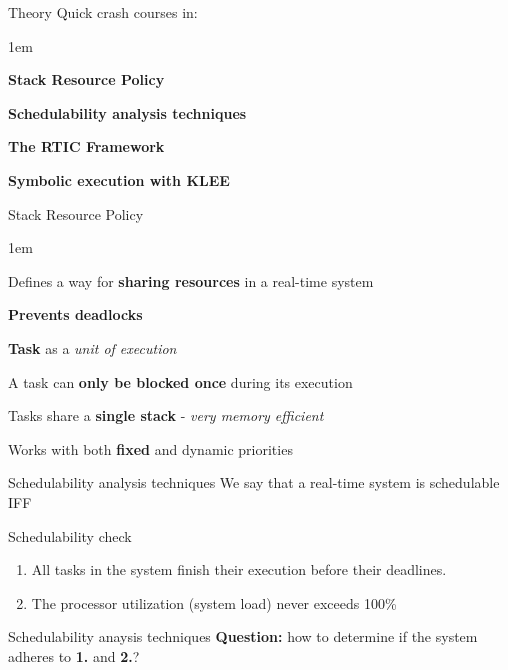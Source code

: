 \begin{frame}{Theory}
    Quick crash courses in:
    \vspace{1em}
    \begin{itemize-size}{1em}
        \item \textbf{Stack Resource Policy}
        \item \textbf{Schedulability analysis techniques}
        \item \textbf{The RTIC Framework}
        \item \textbf{Symbolic execution with KLEE}
    \end{itemize-size}
\end{frame}

\begin{frame}{Stack Resource Policy}
    \begin{itemize-size}{1em}
        \item Defines a way for \textbf{sharing resources} in a real-time system
        \item \textbf{Prevents deadlocks}
        \item \textbf{Task} as a \emph{unit of execution}
        \item A task can \textbf{only be blocked once} during its execution
        \item Tasks share a \textbf{single stack} - \emph{very memory efficient}
        \item Works with both \textbf{fixed} and dynamic priorities
    \end{itemize-size}
\end{frame}


\begin{frame}{Schedulability analysis techniques}
    We say that a real-time system is schedulable IFF
    \vspace{1em}
    \begin{block}{Schedulability check}
        \begin{enumerate}
            \item All tasks in the system finish their execution before their deadlines.
            \item The processor utilization (system load) never exceeds 100\%
        \end{enumerate}
    \end{block}
\end{frame}

\begin{frame}{Schedulability anaysis techniques}
    \textbf{Question:} how to determine if the system adheres to \textbf{1.} and \textbf{2.}?

\end{frame}

